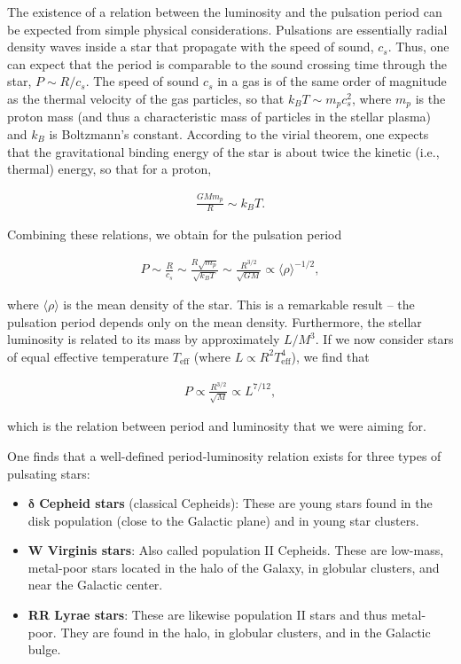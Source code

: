 \documentclass[a4paper,10pt]{article}
\begin{document}
{\noindent}The existence of a relation between the luminosity and the pulsation period can be expected from simple physical considerations. Pulsations are essentially radial density waves inside a star that propagate with the speed of sound, $c_s$. Thus, one can expect that the period is comparable to the sound crossing time through the star, $P\sim R/c_s$. The speed of sound $c_s$ in a gas is of the same order of magnitude as the thermal velocity of the gas particles, so that $k_BT\sim m_pc_s^2$, where $m_p$ is the proton mass (and thus a characteristic mass of particles in the stellar plasma) and $k_B$ is Boltzmann's constant. According to the virial theorem, one expects that the gravitational binding energy of the star is about twice the kinetic (i.e., thermal) energy, so that for a proton,

\begin{align*}
    \frac{GMm_p}{R} \sim k_BT.
\end{align*}

{\noindent}Combining these relations, we obtain for the pulsation period

\begin{align*}
    P\sim\frac{R}{c_s}\sim\frac{R\sqrt{m_p}}{\sqrt{k_BT}} \sim\frac{R^{3/2}}{\sqrt{GM}} \propto \langle\rho\rangle^{-1/2},
\end{align*}

{\noindent}where $\langle\rho\rangle$ is the mean density of the star. This is a remarkable result -- the pulsation period depends only on the mean density. Furthermore, the stellar luminosity is related to its mass by approximately $L/M^3$. If we now consider stars of equal effective temperature $T_\mathrm{eff}$ (where $L\propto R^2T_\mathrm{eff}^4$), we find that

\begin{align*}
    P \propto \frac{R^{3/2}}{\sqrt{M}} \propto L^{7/12},
\end{align*}

{\noindent}which is the relation between period and luminosity that we were aiming for.

{\noindent}One finds that a well-defined period-luminosity relation exists for three types of pulsating stars:

\begin{itemize}
    \item $\boldsymbol{\delta}$ \textbf{Cepheid stars} (classical Cepheids): These are young stars found in the disk population (close to the Galactic plane) and in young star clusters.
    \item \textbf{W Virginis stars}: Also called population II Cepheids. These are low-mass, metal-poor stars located in the halo of the Galaxy, in globular clusters, and near the Galactic center.
    \item \textbf{RR Lyrae stars}: These are likewise population II stars and thus metal-poor. They are found in the halo, in globular clusters, and in the Galactic bulge.
\end{itemize}
\end{document}
